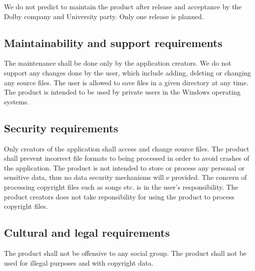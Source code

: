 \documentclass[12pt]{article}
\begin{document}
	We do not predict to maintain the product after release and acceptance by the Dolby company and University party. Only one release is planned.

\subsection{Maintainability and support requirements}

	The maintenance shall be done only by the application creators. We do not support any changes done by the user, which include adding, deleting or changing any source files. The user is allowed to save files in a given directory at any time. The product is intended to be used by private users in the Windows operating systems.

\subsection{Security requirements}

	Only creators of the application shall access and change source files. The product shall prevent incorrect file formats to being processed in order to avoid crashes of the application. The product is not intended to store or process any personal or sensitive data, thus no data security mechanisms will e provided. The concern of processing copyright files such as songs etc. is in the user's responsibility. The product creators does not take reponsibility for using the product to process copyright files.

\subsection{Cultural and legal requirements}

	The product shall not be offensive to any social group. The product shall not be used for illegal purposes and with copyright data.
	
\end{document}
